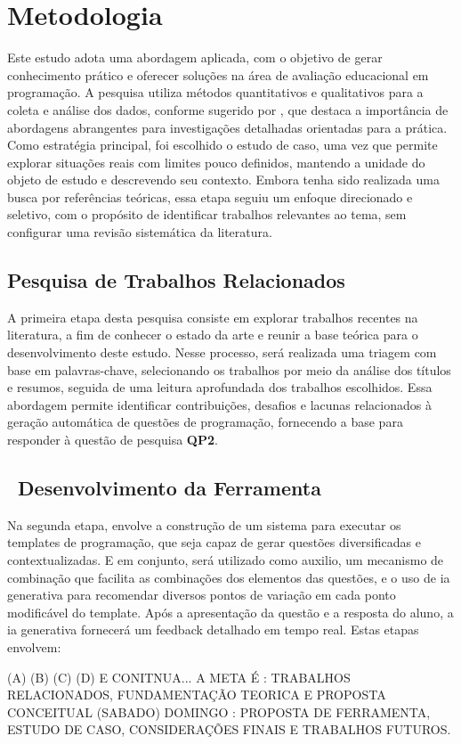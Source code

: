 \chapter{Metodologia}\label{cap:metodologia}

Este estudo adota uma abordagem aplicada, com o objetivo de gerar conhecimento prático e oferecer soluções na área de avaliação educacional em programação. A pesquisa utiliza métodos quantitativos e qualitativos para a coleta e análise dos dados, conforme sugerido por \parencite{Gil2017}, que destaca a importância de abordagens abrangentes para investigações detalhadas orientadas para a prática. Como estratégia principal, foi escolhido o estudo de caso, uma vez que permite explorar situações reais com limites pouco definidos, mantendo a unidade do objeto de estudo e descrevendo seu contexto. Embora tenha sido realizada uma busca por referências teóricas, essa etapa seguiu um enfoque direcionado e seletivo, com o propósito de identificar trabalhos relevantes ao tema, sem configurar uma revisão sistemática da literatura. 

\section{Pesquisa de Trabalhos Relacionados}

A primeira etapa desta pesquisa consiste em explorar trabalhos recentes na literatura, a fim de conhecer o estado da arte e reunir a base teórica para o desenvolvimento deste estudo. Nesse processo, será realizada uma triagem com base em palavras-chave, selecionando os trabalhos por meio da análise dos títulos e resumos, seguida de uma leitura aprofundada dos trabalhos escolhidos. Essa abordagem permite identificar contribuições, desafios e lacunas relacionados à geração automática de questões de programação, fornecendo a base para responder à questão de pesquisa \textbf{QP2}. 


\section{\textbf{ Desenvolvimento da Ferramenta} }
Na segunda etapa, envolve a construção de um sistema para executar os templates de programação, que seja capaz de gerar questões diversificadas e contextualizadas. E em conjunto, será utilizado como auxilio, um mecanismo de combinação que facilita as combinações dos elementos das questões, e o uso de \gls{ia} generativa para recomendar diversos pontos de variação em cada ponto modificável do template. Após a apresentação da questão e a resposta do aluno, a \gls{ia}  generativa fornecerá um feedback detalhado em tempo real. Estas etapas envolvem: 

(A)
(B)
(C)
(D)
E CONITNUA...
A META É : TRABALHOS RELACIONADOS, FUNDAMENTAÇÃO TEORICA E PROPOSTA CONCEITUAL (SABADO)
DOMINGO : PROPOSTA DE FERRAMENTA, ESTUDO DE CASO, CONSIDERAÇÕES FINAIS E TRABALHOS FUTUROS.